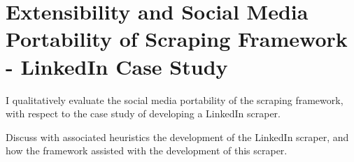 \section{Extensibility and Social Media Portability of Scraping Framework - LinkedIn Case Study}

I qualitatively evaluate the social media portability of the scraping framework, with respect to the case study of developing a LinkedIn scraper. 

Discuss with associated heuristics the development of the LinkedIn scraper, and how the framework assisted with the development of this scraper. %

